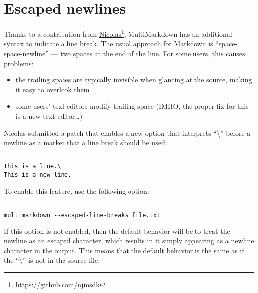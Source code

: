 
\def\mytitle{Escaped Newlines}
\def\myauthor{Fletcher T. Penney}
\def\version{4.5.1}
\def\revised{2014-02-05}
\def\latexmode{memoir}


\chapter{Escaped newlines}
\label{escapednewlines}

Thanks to a contribution from \href{https://github.com/njmsdk}{Nicolas}\footnote{\href{https://github.com/njmsdk}{https:/\slash github.com\slash njmsdk}}, MultiMarkdown has an additional syntax to indicate a line break. The usual approach for Markdown is ``space-space-newline'' --- two spaces at the end of the line. For some users, this causes problems:

\begin{itemize}
\item the trailing spaces are typically invisible when glancing at the source, making it easy to overlook them

\item some users' text editors modify trailing space (IMHO, the proper fix for this is a new text editor{\ldots})

\end{itemize}

Nicolas submitted a patch that enables a new option that interprets ``\textbackslash{}'' before a newline as a marker that a line break should be used:

\begin{adjustwidth}{2.5em}{2.5em}
\begin{verbatim}

This is a line.\
This is a new line.

\end{verbatim}
\end{adjustwidth}

To enable this feature, use the following option:

\begin{adjustwidth}{2.5em}{2.5em}
\begin{verbatim}

multimarkdown --escaped-line-breaks file.txt

\end{verbatim}
\end{adjustwidth}

If this option is not enabled, then the default behavior will be to treat the newline as an escaped character, which results in it simply appearing as a newline character in the output. This means that the default behavior is the same as if the ``\textbackslash{}'' is not in the source file.




